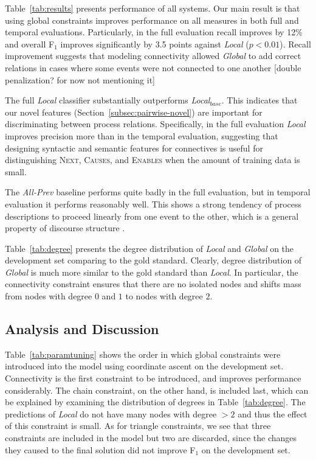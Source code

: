 Table~\ref{tab:results} presents performance of all systems. Our main result is that using global constraints improves performance on all measures in both full and temporal evaluations. Particularly, in the full evaluation recall improves by 12\% and overall F$_1$ improves significantly by 3.5 points against \emph{Local} ($p<0.01$). Recall improvement suggests that modeling connectivity allowed \emph{Global} to add correct relations in cases where some events were not connected to one another [double penalization? for now not mentioning it]

The full \emph{Local} classifier substantially outperforms \emph{Local$_{base}$}. This indicates that our novel features (Section~\ref{subsec:pairwise-novel}) are important for discriminating between process relations. Specifically, in the full evaluation \emph{Local} improves precision more than in the temporal evaluation, suggesting that designing syntactic and semantic features for connectives is useful for distinguishing \textsc{Next}, \textsc{Causes}, and \textsc{Enables} when the amount of training data is small.

The \emph{All-Prev} baseline performs quite badly in the full evaluation, but in temporal evaluation it performs reasonably well. This shows a strong tendency of process descriptions to proceed linearly from one event to the other, which is a general property of discourse structure \cite{schegloff73}.

Table~\ref{tab:degree} presents the degree distribution of \emph{Local} and \emph{Global} on the development set comparing to the gold standard. Clearly, degree distribution of \emph{Global} is much more similar to the gold standard than \emph{Local}. In particular, the connectivity constraint ensures that there are no isolated nodes and shifts mass from nodes with degree $0$ and $1$ to nodes with degree $2$.


\subsection{Analysis and Discussion} \label{subsec:analysis}

Table~\ref{tab:paramtuning} shows the order in which global constraints were introduced into the model using coordinate ascent on the development set. Connectivity is the first constraint to be introduced, and improves performance considerably. The chain constraint, on the other hand, is included last, which can be explained by examining the distribution of degrees in Table~\ref{tab:degree}. The predictions of \emph{Local} do not have many nodes with degree $>2$ and thus the effect of this constraint is small. As for triangle constraints, we see that three constraints are included in the model but two are discarded, since the changes they caused to the final solution did not improve F$_1$ on the development set.

